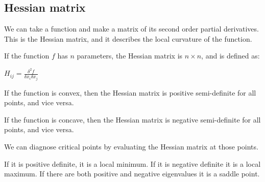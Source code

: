 
\subsection{Hessian matrix}

We can take a function and make a matrix of its second order partial derivatives.  This is the Hessian matrix, and it describes the local curvature of the function.

If the function \(f\) has \(n\) parameters, the Hessian matrix is \(n\times n\), and is defined as:

\(H_{ij}=\frac{\delta^2 f}{\delta x_i \delta x_j}\)

If the function is convex, then the Hessian matrix is positive semi-definite for all points, and vice versa.

If the function is concave, then the Hessian matrix is negative semi-definite for all points, and vice versa.

We can diagnose critical points by evaluating the Hessian matrix at those points.

If it is positive definite, it is a local minimum. If it is negative definite it is a local maximum. If there are both positive and negative eigenvalues it is a saddle point.

